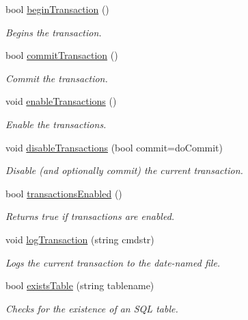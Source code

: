 \begin{CompactItemize}
bool \hyperlink{classSQLiteConnection_SQLiteConnectiona6}{begin\-Transaction} ()
\begin{CompactList}\small\item\em Begins the transaction.\item\end{CompactList}\item 
bool \hyperlink{classSQLiteConnection_SQLiteConnectiona7}{commit\-Transaction} ()
\begin{CompactList}\small\item\em Commit the transaction.\item\end{CompactList}\item 
void \hyperlink{classSQLiteConnection_SQLiteConnectiona8}{enable\-Transactions} ()
\begin{CompactList}\small\item\em Enable the transactions.\item\end{CompactList}\item 
void \hyperlink{classSQLiteConnection_SQLiteConnectiona9}{disable\-Transactions} (bool commit=do\-Commit)
\begin{CompactList}\small\item\em Disable (and optionally commit) the current transaction.\item\end{CompactList}\item 
bool \hyperlink{classSQLiteConnection_SQLiteConnectiona10}{transactions\-Enabled} ()
\begin{CompactList}\small\item\em Returns true if transactions are enabled.\item\end{CompactList}\item 
void \hyperlink{classSQLiteConnection_SQLiteConnectiona11}{log\-Transaction} (string cmdstr)
\begin{CompactList}\small\item\em Logs the current transaction to the date-named file.\item\end{CompactList}\item 
bool \hyperlink{classSQLiteConnection_SQLiteConnectiona12}{exists\-Table} (string tablename)
\begin{CompactList}\small\item\em Checks for the existence of an SQL table.\item\end{CompactList}\item 

\end{CompactItemize}
